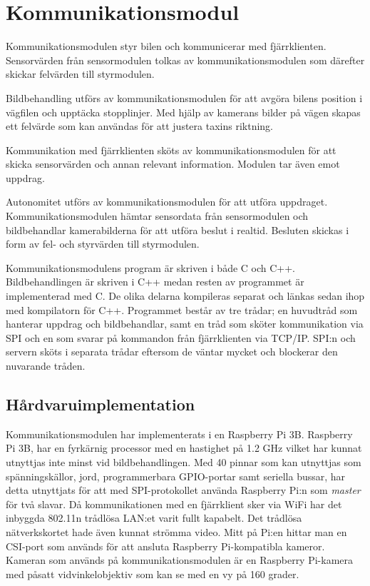 \documentclass[tekniskrapport/tech.tex]{subfiles}
\begin{document}
\section{Kommunikationsmodul}
Kommunikationsmodulen styr bilen och kommunicerar med fjärrklienten.
Sensorvärden från sensormodulen tolkas av kommunikationsmodulen som därefter
skickar felvärden till styrmodulen.

Bildbehandling utförs av kommunikationsmodulen för att
avgöra bilens position i vägfilen och upptäcka stopplinjer. Med hjälp av
kamerans bilder på vägen skapas ett felvärde som kan användas för att justera
taxins riktning.

Kommunikation med fjärrklienten sköts av kommunikationsmodulen för
att skicka sensorvärden och annan relevant information. Modulen tar
även emot uppdrag.

Autonomitet utförs av kommunikationsmodulen för att utföra uppdraget.
Kommunikationsmodulen hämtar sensordata från sensormodulen och bildbehandlar
kamerabilderna för att utföra beslut i realtid. Besluten skickas i form av fel-
och styrvärden till styrmodulen.

Kommunikationsmodulens program är skriven i både C och C++. Bildbehandlingen är
skriven i C++ medan resten av programmet är implementerad med C. De olika
delarna kompileras separat och länkas sedan ihop med kompilatorn för C++.
Programmet består av tre trådar; en huvudtråd som hanterar uppdrag och
bildbehandlar, samt en tråd som sköter kommunikation via SPI och en som svarar
på kommandon från fjärrklienten via TCP/IP. SPI:n och servern sköts i separata
trådar eftersom de väntar mycket och blockerar den nuvarande tråden.

\subsection{Hårdvaruimplementation} 
Kommunikationsmodulen har implementerats i en Raspberry Pi 3B. Raspberry Pi 3B,
har en fyrkärnig processor med en hastighet på 1.2 GHz vilket har kunnat
utnyttjas inte minst vid bildbehandlingen. Med 40 pinnar som kan utnyttjas som
spänningskällor, jord, programmerbara GPIO-portar samt seriella bussar, har
detta utnyttjats för att med SPI-protokollet använda Raspberry Pi:n som
\emph{master} för två slavar. Då kommunikationen med en fjärrklient sker via
WiFi har det inbyggda 802.11n trådlösa LAN:et varit fullt kapabelt. Det
trådlösa nätverkskortet hade även kunnat strömma video. Mitt på Pi:en hittar
man en CSI-port som används för att ansluta Raspberry Pi-kompatibla kameror.
Kameran som används på kommunikationsmodulen är en Raspberry Pi-kamera med
påsatt vidvinkelobjektiv som kan se med en vy på 160 grader.
\end{document}
